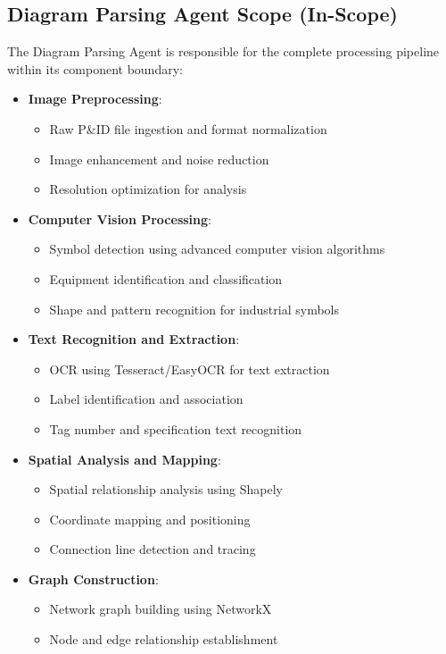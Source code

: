 \documentclass[12pt]{report}
\begin{document}
\subsection{Diagram Parsing Agent Scope (In-Scope)}
The Diagram Parsing Agent is responsible for the complete processing pipeline within its component boundary:
\begin{itemize}
  \item \textbf{Image Preprocessing}: 
    \begin{itemize}
      \item Raw P\&ID file ingestion and format normalization
      \item Image enhancement and noise reduction
      \item Resolution optimization for analysis
    \end{itemize}
  \item \textbf{Computer Vision Processing}:
    \begin{itemize}
      \item Symbol detection using advanced computer vision algorithms
      \item Equipment identification and classification
      \item Shape and pattern recognition for industrial symbols
    \end{itemize}
  \item \textbf{Text Recognition and Extraction}:
    \begin{itemize}
      \item OCR using Tesseract/EasyOCR for text extraction
      \item Label identification and association
      \item Tag number and specification text recognition
    \end{itemize}
  \item \textbf{Spatial Analysis and Mapping}:
    \begin{itemize}
      \item Spatial relationship analysis using Shapely
      \item Coordinate mapping and positioning
      \item Connection line detection and tracing
    \end{itemize}
  \item \textbf{Graph Construction}:
    \begin{itemize}
      \item Network graph building using NetworkX
      \item Node and edge relationship establishment

\end{itemize}
\end{itemize}
\end{document}
